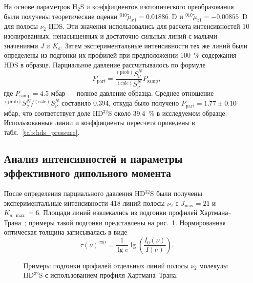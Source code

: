 На основе параметров H$_2$S и коэффициентов изотопического преобразования были получены теоретические
оценки ${}^{010}\widetilde{\mu}_{x1}=0.01886$~D и
${}^{010}\widetilde{\mu}_{z1}=-0.00855$~D для полосы $\nu_2$ HDS. Эти значения использовались для
расчета интенсивностей 10 изолированных, ненасыщенных и достаточно сильных линий с малыми значениями
$J$ и $K_a$. Затем экспериментальные интенсивности тех же линий были определены из подгонки их
профилей при предположении 100~\% содержания HDS в образце. Парциальное давление рассчитывалось по
формуле
\begin{equation}
P_{\textrm{part}}=\frac{{}^{(\textrm{prob})}S^{N}_{\nu}}{{}^{(\textrm{calc})}S^{N}_{\nu}}
P_{\textrm{samp}},
\label{eq:hds_partial_pressure}
\end{equation}
где $P_{\textrm{samp}}=4.5$ мбар --- полное давление образца. Среднее отношение
${}^{(\textrm{prob})}S^{N}_{\nu}/{}^{(\textrm{calc})}S^{N}_{\nu}$ составило 0.394, откуда было получено
$P_{\textrm{part}}=1.77\pm0.10$ мбар, что соответствует доле HD$^{32}$S около 39.4~\% в исследуемом
образце. Использованные линии и коэффициенты пересчета приведены в табл.~\ref{tab:hds_pressure}.



\subsection{Анализ интенсивностей и параметры эффективного дипольного момента}

После определения парциального давления HD$^{32}$S были получены экспериментальные интенсивности
418 линий полосы $\nu_2$ с $J_{\max}=21$ и $K_{a,\max}=6$. Площади линий извлекались из подгонки
профилей Хартмана--Трана~\cite{d2s_tennyson2014}; примеры такой подгонки представлены на
рис.~\ref{fig:hds_lineshape}. Нормированная оптическая толщина записывалась в виде
\begin{equation}
\tau(\nu)^{\textrm{exp}}=\frac{1}{\lg e}\lg\left(\frac{I_0(\nu)}{I(\nu)}\right).
\label{eq:hds_tau}
\end{equation}

\begin{figure}[htbp]
    \centering
    \caption{Примеры подгонки профилей отдельных линий полосы $\nu_2$ молекулы HD$^{32}$S с
    использованием профиля Хартмана--Трана.}
    \label{fig:hds_lineshape}
\end{figure}

